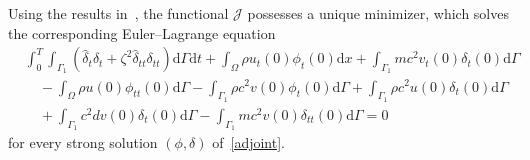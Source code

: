 \documentclass[10pt]{elsarticle}
\begin{document}
Using the results in~\cite[Chapter 8.2.4, pp. 477-478]{evans2022partial}, the functional $\mathcal{J}$ possesses a unique minimizer, which solves the corresponding Euler--Lagrange equation
\begin{equation}\label{euler-lagrange}
\begin{split}
&\int_{0}^{T}\int_{\Gamma_1}\left(\hat{\delta}_t\delta_t+ \zeta^2\hat{\delta}_{tt}\delta_{tt} \right) \mathrm{d}\Gamma \mathrm{d}t + \int_{\Omega}\rho u_{t}(0)\phi_t(0)\mathrm{d}x + \int_{\Gamma_1}m c^2 v_{t}(0)\delta_t(0)\mathrm{d}\Gamma\\
&\quad - \int_{\Omega}\rho u(0)\phi_{tt}(0)\mathrm{d}\Gamma - \int_{\Gamma_1}\rho c^2 v(0)\phi_t(0)\mathrm{d}\Gamma + \int_{\Gamma_1}\rho c^2 u(0)\delta_t(0)\mathrm{d}\Gamma\\
&\quad + \int_{\Gamma_1}c^2 d v(0)\delta_t(0)\mathrm{d}\Gamma - \int_{\Gamma_1}m c^2 v(0)\delta_{tt}(0)\mathrm{d}\Gamma= 0
\end{split}
\end{equation}
for every strong solution $(\phi, \delta)$ of~\eqref{adjoint}.
\end{document}
